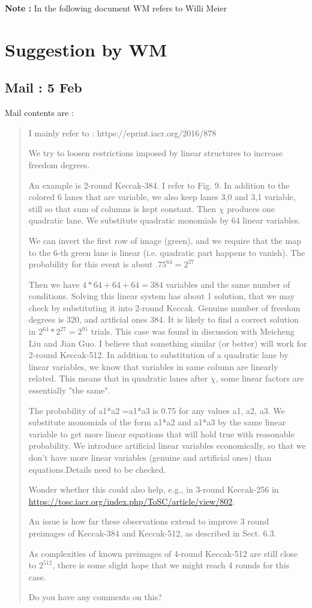 \documentclass{article}
\begin{document}
\textbf{Note :} In the following document WM refers to Willi Meier

\section{Suggestion by WM}

\subsection{Mail : 5 Feb}

Mail contents are : 
\begin{quote}
    I mainly refer to : https://eprint.iacr.org/2016/878
    
    We try to loosen restrictions imposed by linear structures to increase freedom degrees.
    
    An example is 2-round Keccak-384. I refer to Fig. 9. In addition to the colored 6 lanes that are variable, we also keep lanes 3,0 and 3,1 variable, still so that sum of columns is kept constant. Then $\chi$ produces one quadratic lane. We substitute quadratic monomials by 64 linear variables.
    
    We can invert the first row of image (green), and we require that the map to the 6-th green lane is linear (i.e. quadratic part happens to vanish). The probability for this event is about $.75^{64} = 2^{27}$

    Then we have $ 4*64 + 64 + 64 = 384$ variables and the same number of conditions. Solving this linear system has about 1 solution, that we may check by substituting it into 2-round Keccak. Genuine number of freedom degrees is 320, and artficial ones 384. It is likely to find a correct solution in $2^{64} * 2^{27}= 2^{91}$ trials. This case was found in discussion with Meicheng Liu and Jian Guo.
    I believe that something similar (or better) will work for 2-round Keccak-512. In addition to substitution of a quadratic lane by linear variables, we know that variables in same column are linearly related. This means that in quadratic lanes after $\chi$, some linear factors  are essentially "the same".

    The probability of a1*a2 =a1*a3 is 0.75 for any values a1, a2, a3. We substitute monomials of the form a1*a2  and a1*a3 by the same linear variable to get more linear equations that will hold true with reasonable probability. We introduce artificial linear variables economically, so that we don't have more linear variables (genuine and artificial ones) than equations.Details need to be checked.
    
    Wonder whether this could also help, e.g., in 3-round Keccak-256 in \url{https://tosc.iacr.org/index.php/ToSC/article/view/802}.
    
    An issue is how far these observations extend to improve 3 round preimages of Keccak-384 and Keccak-512, as described in Sect. 6.3.
    
    As complexities of known preimages of 4-round Keccak-512 are still close to $2^{512}$, there is some slight hope that we might reach 4 rounds for this case.
    
    Do you have any comments on this?
    \end{quote}
    
\end{document}
